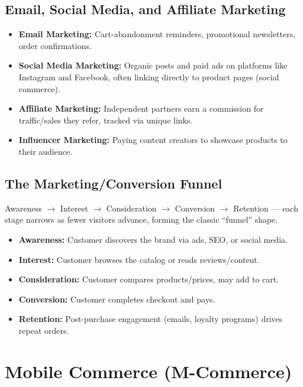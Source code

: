 \documentclass[11pt,a4paper]{article}
\begin{document}
\subsection{Email, Social Media, and Affiliate Marketing}
\begin{itemize}[leftmargin=*]
  \item \textbf{Email Marketing:} Cart-abandonment reminders, promotional newsletters, order confirmations.
  \item \textbf{Social Media Marketing:} Organic posts and paid ads on platforms like Instagram and Facebook, often linking directly to product pages (social commerce).
  \item \textbf{Affiliate Marketing:} Independent partners earn a commission for traffic/sales they refer, tracked via unique links.
  \item \textbf{Influencer Marketing:} Paying content creators to showcase products to their audience.
\end{itemize}

\subsection{The Marketing/Conversion Funnel}
\begin{conceptbox}
Awareness $\to$ Interest $\to$ Consideration $\to$ Conversion $\to$ Retention --- each stage narrows as fewer visitors advance, forming the classic ``funnel'' shape.
\end{conceptbox}

\begin{itemize}[leftmargin=*]
  \item \textbf{Awareness:} Customer discovers the brand via ads, SEO, or social media.
  \item \textbf{Interest:} Customer browses the catalog or reads reviews/content.
  \item \textbf{Consideration:} Customer compares products/prices, may add to cart.
  \item \textbf{Conversion:} Customer completes checkout and pays.
  \item \textbf{Retention:} Post-purchase engagement (emails, loyalty programs) drives repeat orders.
\end{itemize}

\section{Mobile Commerce (M-Commerce)}
\end{document}

